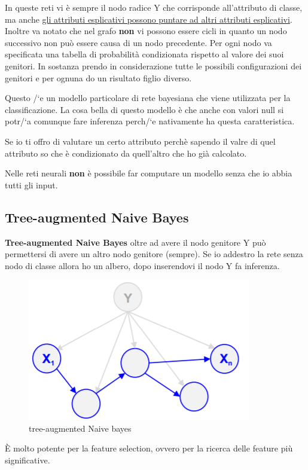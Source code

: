 In queste reti vi \`e sempre il nodo radice Y che corrisponde all'attributo di classe, ma anche \underline{gli attributi esplicativi possono puntare ad altri attributi esplicativi}. Inoltre va notato che nel grafo \textbf{non} vi possono essere cicli in quanto un nodo successivo non pu\`o essere causa di un nodo precedente. Per ogni nodo va specificata una tabella di probabilit\`a condizionata rispetto al valore dei suoi genitori. In sostanza prendo in considerazione tutte le possibili configurazioni dei genitori e per ognuna do un risultato figlio diverso.

Questo /`e un modello particolare di rete bayesiana che viene utilizzata per la classificazione. La cosa bella di questo modello \`e che anche con valori null si potr/`a comunque fare inferenza perch/`e nativamente ha questa caratteristica. 

Se io ti offro di valutare un certo attributo perch\`e sapendo il valre di quel attributo so che \`e condizionato da quell'altro che ho gi\`a calcolato.  

Nelle reti neurali \textbf{non} \`e possibile far computare un modello senza che io abbia tutti gli input. 
\\

\subsection{Tree-augmented Naive Bayes}
\textbf{Tree-augmented Naive Bayes} oltre ad avere il nodo genitore Y pu\`o permettersi di avere un altro nodo genitore (sempre). Se io addestro la rete senza nodo di classe allora ho un albero, dopo inserendovi il nodo Y fa inferenza. 

\begin{figure}[h!]
	\centering
	\includegraphics[height=0.35 \linewidth]{pict/treenaivebayes.png}
	\caption{tree-augmented Naive bayes}
\end{figure}

\`E molto potente per la feature selection, ovvero per la ricerca delle feature pi\`u significative. 

